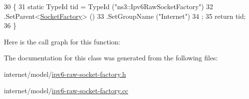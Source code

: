 \begin{DoxyCode}
30 \{
31   \textcolor{keyword}{static} TypeId tid = TypeId (\textcolor{stringliteral}{"ns3::Ipv6RawSocketFactory"})
32     .SetParent<\hyperlink{classns3_1_1SocketFactory_a98a41212740c38fb7db9ea698800f8cf}{SocketFactory}> ()
33     .SetGroupName (\textcolor{stringliteral}{"Internet"})
34   ;
35   \textcolor{keywordflow}{return} tid;
36 \}
\end{DoxyCode}


Here is the call graph for this function\+:




The documentation for this class was generated from the following files\+:\begin{DoxyCompactItemize}
\item 
internet/model/\hyperlink{ipv6-raw-socket-factory_8h}{ipv6-\/raw-\/socket-\/factory.\+h}\item 
internet/model/\hyperlink{ipv6-raw-socket-factory_8cc}{ipv6-\/raw-\/socket-\/factory.\+cc}\end{DoxyCompactItemize}
